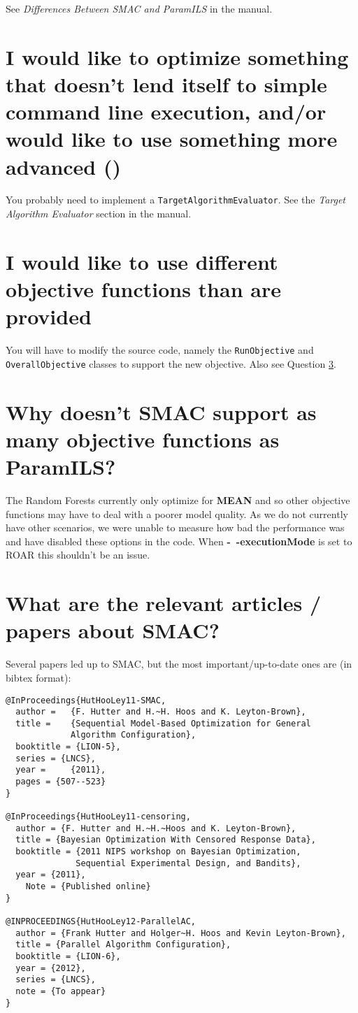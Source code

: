 \documentclass[11pt,letterpaper,oneside]{article}
\begin{document}
	See \emph{Differences Between SMAC and ParamILS} in the manual.

\section{I would like to optimize something that doesn't lend itself to simple command line execution, and/or would like to use something more advanced ()}

	You probably need to implement a \texttt{TargetAlgorithmEvaluator}. See the \emph{Target Algorithm Evaluator} section in the manual.

\section{I would like to use different objective functions than are provided}

	You will have to modify the source code, namely the \texttt{RunObjective} and \texttt{OverallObjective} classes to support the new objective. Also see Question \ref{sec:rf-objectives}.

\section{Why doesn't SMAC support as many objective functions as ParamILS?}
\label{sec:rf-objectives}

	The Random Forests currently only optimize for \textbf{MEAN} and so other objective functions may have to deal with a poorer model quality. As we do not currently have other scenarios, we were unable to measure how bad the performance was and have disabled these options in the code. When \textbf{-~$\!$-executionMode} is set to ROAR this shouldn't be an issue.

\section{What are the relevant articles / papers about SMAC?}

Several papers led up to SMAC, but the most important/up-to-date ones are (in bibtex format):
\begin{verbatim}
@InProceedings{HutHooLey11-SMAC,
  author =	 {F. Hutter and H.~H. Hoos and K. Leyton-Brown},
  title =	 {Sequential Model-Based Optimization for General 
             Algorithm Configuration},
  booktitle = {LION-5},
  series = {LNCS},
  year =	 {2011},
  pages = {507--523}
}

@InProceedings{HutHooLey11-censoring,
  author = {F. Hutter and H.~H.~Hoos and K. Leyton-Brown},
  title = {Bayesian Optimization With Censored Response Data},
  booktitle = {2011 NIPS workshop on Bayesian Optimization, 
              Sequential Experimental Design, and Bandits},
  year = {2011},
	Note = {Published online}
}

@INPROCEEDINGS{HutHooLey12-ParallelAC,
  author = {Frank Hutter and Holger~H. Hoos and Kevin Leyton-Brown},
  title = {Parallel Algorithm Configuration},
  booktitle = {LION-6},
  year = {2012},
  series = {LNCS},
  note = {To appear}
}
\end{verbatim}
\end{document}
